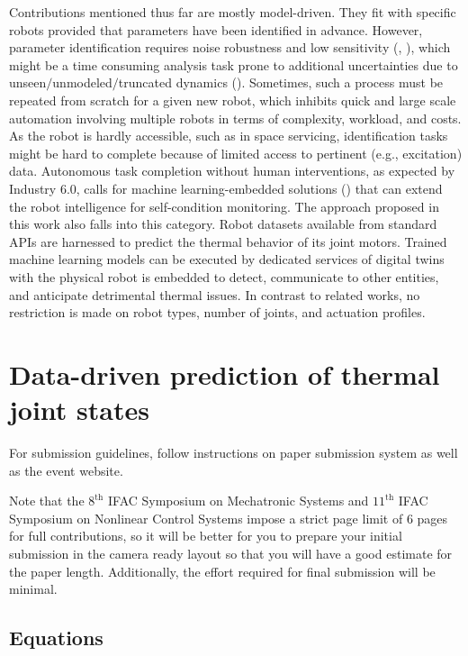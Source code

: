 \documentclass{ifacconf}
\begin{document}
Contributions mentioned thus far are mostly model-driven. They fit  with specific robots provided that parameters have been  identified in advance. However, parameter identification requires   noise robustness and low  sensitivity (\cite{zhang2024model}, \cite{de2024non}), which might be a time consuming analysis task  prone to additional uncertainties due to unseen$\slash$unmodeled$\slash$truncated dynamics (\cite{shang2024general}). Sometimes, such a process must  be repeated from scratch for a given new robot, which inhibits quick and large scale automation involving multiple robots in terms of complexity, workload, and costs. As the robot is hardly accessible, such as in space servicing,  identification tasks might be hard to complete because of limited access to pertinent (e.g., excitation) data. Autonomous task completion without human interventions, as expected by Industry 6.0, calls for machine learning-embedded solutions (\cite{carayannis2024toward}) that can extend the robot intelligence for self-condition monitoring. The approach proposed in this work also falls into this category. Robot datasets available from standard APIs are harnessed to predict the thermal behavior of its joint motors. Trained machine learning models can be executed by dedicated services of  digital twins with the physical robot is embedded to detect, communicate to other entities, and anticipate  detrimental thermal issues. In contrast to related works, no restriction is made  on  robot types, number of joints, and actuation profiles.

\section{Data-driven prediction of  thermal joint states}

For submission guidelines, follow instructions on paper submission
system as well as the event website.

Note that the $8^{\mathrm{th}}$ IFAC Symposium on Mechatronic Systems and $11^{\mathrm{th}}$ IFAC Symposium on Nonlinear Control Systems impose a strict page limit of 6 pages for full contributions, so it will be better for you to prepare your initial submission in the camera ready layout so that you will have a good estimate for the paper length. Additionally, the effort required for final submission will be minimal.

\subsection{Equations}
\end{document}
